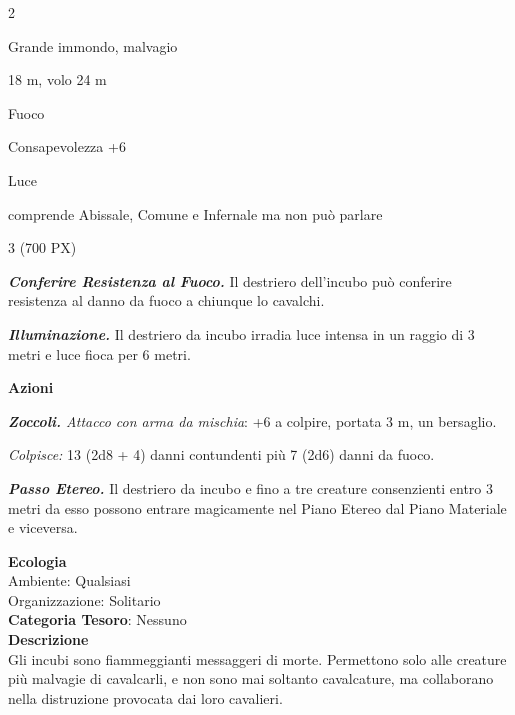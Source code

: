 \begin{multicols}{2}
{
\begin{description}[noitemsep, topsep=0pt, parsep=0pt, partopsep=0pt, itemsep=1pt, leftmargin=2.35cm,  labelwidth=2.2cm, itemindent=0cm, listparindent=0pt] %
\setlength{\baselineskip}{10pt}
\item[\textbf{Taglia/Tipo}] Grande immondo, malvagio
\item[\textbf{Caratt.}] 
\item[\textbf{Punti Ferita}] 
\item[\textbf{Movimento}] 18 m, volo 24 m
\item[\textbf{Tiri Salvez.}] 
\item[\textbf{Imm. Danni}] Fuoco
\item[\textbf{Comp.}] Consapevolezza +6
\item[\textbf{Vulnerabilità}] Luce
\item[\textbf{Sensi}] 
\item[\textbf{Linguaggi}] comprende Abissale, Comune e Infernale ma non può parlare
\item[\textbf{Sfida}] 3 (700 PX)
\end{description}
\smallskip

\emph{\textbf{Conferire Resistenza al Fuoco.}} Il destriero dell'incubo può conferire resistenza al danno da fuoco a chiunque lo cavalchi.

\emph{\textbf{Illuminazione.}} Il destriero da incubo irradia luce intensa in un raggio di 3 metri e luce fioca per 6 metri.

\textbf{Azioni}

\emph{\textbf{Zoccoli.} Attacco con arma da mischia}: +6 a colpire, portata 3 m, un bersaglio.

\emph{Colpisce:} 13 (2d8 + 4) danni contundenti più 7 (2d6) danni da fuoco.

\emph{\textbf{Passo Etereo.}} Il destriero da incubo e fino a tre creature consenzienti entro 3 metri da esso possono entrare magicamente nel Piano Etereo dal Piano Materiale e viceversa.

\textbf{Ecologia}\\
Ambiente: Qualsiasi\\
Organizzazione: Solitario\\
\textbf{Categoria Tesoro}: Nessuno\\
\textbf{Descrizione}\\
Gli incubi sono fiammeggianti messaggeri di morte. Permettono solo alle creature più malvagie di cavalcarli, e non sono mai soltanto cavalcature, ma collaborano nella distruzione provocata dai loro cavalieri.

}
\end{multicols}
